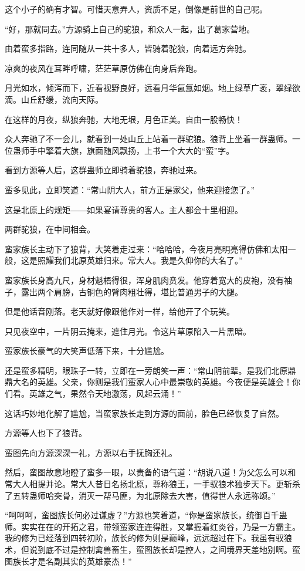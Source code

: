 \begin{this_body}
这个小子的确有才智。可惜天意弄人，资质不足，倒像是前世的自己呢。

“好，那就同去。”方源骑上自己的驼狼，和众人一起，出了葛家营地。

由着蛮多指路，连同随从一共十多人，皆骑着驼狼，向着远方奔驰。

凉爽的夜风在耳畔呼啸，茫茫草原仿佛在向身后奔跑。

月光如水，倾泻而下，近看视野良好，远看月华氤氲如烟。地上绿草广袤，翠绿欲滴。山丘舒缓，流向天际。

在这样的月夜，纵狼奔驰，大地无垠，月色正美。自由一股畅快！

众人奔驰了不一会儿，就看到一处山丘上站着一群驼狼。狼背上坐着一群蛊师。一位蛊师手中擎着大旗，旗面随风飘扬，上书一个大大的“蛮”字。

看到方源等人后，这群蛊师立即骑着驼狼，奔驰过来。

蛮多见此，立即笑道：“常山阴大人，前方正是家父，他来迎接您了。”

这是北原上的规矩――如果宴请尊贵的客人。主人都会十里相迎。

两群驼狼，在中间相会。

蛮家族长主动下了狼背，大笑着走过来：“哈哈哈，今夜月亮明亮得仿佛和太阳一般，这是照耀我们北原英雄归来。常大人。我是久仰你的大名了。”

蛮家族长身高九尺，身材魁梧得很，浑身肌肉贲发。他穿着宽大的皮袍，没有袖子，露出两个肩膀，古铜色的臂肉粗壮得，堪比普通男子的大腿。

但是他话音刚落。老天就好像跟他作对一样，给他开了个玩笑。

只见夜空中，一片阴云掩来，遮住月光。令这片草原陷入一片黑暗。

蛮家族长豪气的大笑声低落下来，十分尴尬。

还是蛮多精明，眼珠子一转，立即在一旁朗笑一声：“常山阴前辈。是我们北原鼎鼎大名的英雄。父亲，你则是我们蛮家人心中最崇敬的英雄。今夜便是英雄会！你们看。英雄之气，果然令天地激荡，风起云涌！”

这话巧妙地化解了尴尬，当蛮家族长走到方源的面前，脸色已经恢复了自然。

方源等人也下了狼背。

蛮图先向方源深深一礼，方源以右手抚胸还礼。

然后，蛮图故意地瞪了蛮多一眼，以责备的语气道：“胡说八道！为父怎么可以和常大人相提并论。常大人昔日名扬北原，尊称狼王，一手驭狼术独步天下。更斩杀了五转蛊师哈突骨，消灭一帮马匪，为北原除去大害，值得世人永远称颂。”

“呵呵呵，蛮图族长何必过谦虚？”方源也笑着道，“你是蛮家族长，统御百千蛊师。实实在在的开拓之君，带领蛮家连连得胜，又掌握着红炎谷，乃是一方霸主。我的修为已经落到四转初阶，族长的修为则是巅峰，远远超过在下。我虽有驭狼术，但说到底不过是控制禽兽畜生，蛮图族长却是控人，之间境界天差地别啊。蛮图族长才是名副其实的英雄豪杰！”


\end{this_body}
